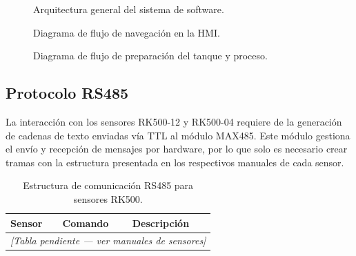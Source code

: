\documentclass[11pt,tesis,twoside,openright,spanish]{upiiztt}
\begin{document}
\begin{figure}[H]
  \centering
  \caption{Arquitectura general del sistema de software.}
  \label{fig:arq_software}
\end{figure}

\begin{figure}[H]
  \centering
  \caption{Diagrama de flujo de navegación en la HMI.}
  \label{fig:flujo_hmi}
\end{figure}

\begin{figure}[H]
  \centering
  \caption{Diagrama de flujo de preparación del tanque y proceso.}
  \label{fig:flujo_proceso}
\end{figure}

\subsection{Protocolo RS485}

La interacción con los sensores RK500-12 y RK500-04 requiere de la generación de cadenas de texto enviadas vía TTL al módulo MAX485. Este módulo gestiona el envío y recepción de mensajes por hardware, por lo que solo es necesario crear tramas con la estructura presentada en los respectivos manuales de cada sensor.

\begin{table}[H]
  \centering
  \caption{Estructura de comunicación RS485 para sensores RK500.}
  \label{tab:rs485}
  \begin{tabular}{lll}
    \toprule
    \textbf{Sensor} & \textbf{Comando} & \textbf{Descripción} \\
    \midrule
    \multicolumn{3}{c}{\textit{[Tabla pendiente — ver manuales de sensores]}} \\
    \bottomrule
  \end{tabular}
\end{table}
\end{document}
